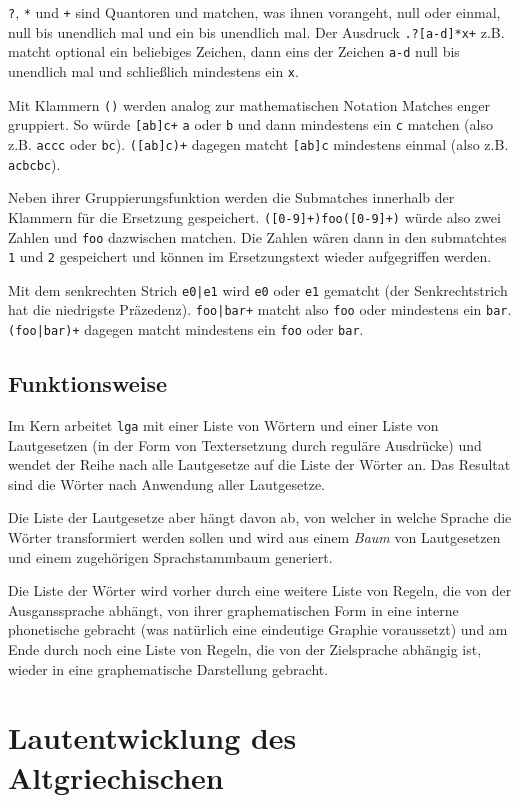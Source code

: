 \documentclass[12pt,a4paper,normalheadings]{scrartcl}
\begin{document}
\texttt{?}, \texttt{*} und \texttt{+} sind Quantoren
und matchen, was ihnen vorangeht, null oder einmal, null bis unendlich mal
und ein bis unendlich mal.
Der Ausdruck \texttt{.?[a-d]*x+} z.B.
matcht optional ein beliebiges Zeichen, dann eins der Zeichen \texttt{a-d}
null bis unendlich mal und schließlich mindestens ein \texttt{x}.

Mit Klammern \texttt{()} werden analog zur mathematischen Notation
Matches enger gruppiert.
So würde \texttt{[ab]c+} \texttt{a} oder \texttt{b} und dann mindestens ein
\texttt{c} matchen (also z.B. \texttt{accc} oder \texttt{bc}).
\texttt{([ab]c)+} dagegen matcht \texttt{[ab]c} mindestens einmal
(also z.B. \texttt{acbcbc}).

Neben ihrer Gruppierungsfunktion werden die Submatches innerhalb
der Klammern für die Ersetzung gespeichert.
\texttt{([0-9]+)foo([0-9]+)} würde also zwei Zahlen und \texttt{foo} dazwischen
matchen.
Die Zahlen wären dann in den submatchtes \texttt{1} und \texttt{2} gespeichert
und können im Ersetzungstext wieder aufgegriffen werden.

Mit dem senkrechten Strich \texttt{e0|e1} wird \texttt{e0}
oder \texttt{e1} gematcht (der Senkrechtstrich hat die niedrigste Präzedenz).
\texttt{foo|bar+} matcht also \texttt{foo} oder mindestens ein \texttt{bar}.
\texttt{(foo|bar)+} dagegen matcht mindestens ein \texttt{foo} oder \texttt{bar}.

\subsection{Funktionsweise}

Im Kern arbeitet \texttt{lga} mit einer Liste von Wörtern
und einer Liste von Lautgesetzen
(in der Form von Textersetzung durch reguläre Ausdrücke)
und wendet der Reihe nach alle Lautgesetze auf die Liste der Wörter an.
Das Resultat sind die Wörter nach Anwendung aller Lautgesetze.

Die Liste der Lautgesetze aber hängt davon ab,
von welcher in welche Sprache die Wörter transformiert werden sollen
und wird aus einem \emph{Baum} von Lautgesetzen und einem
zugehörigen Sprachstammbaum generiert.

Die Liste der Wörter wird vorher durch eine weitere Liste von Regeln,
die von der Ausganssprache abhängt,
von ihrer graphematischen Form in eine interne phonetische gebracht
(was natürlich eine eindeutige Graphie voraussetzt)
und am Ende durch noch eine Liste von Regeln,
die von der Zielsprache abhängig ist,
wieder in eine graphematische Darstellung gebracht.

\section{Lautentwicklung des Altgriechischen}

\printbibliography
\end{document}
